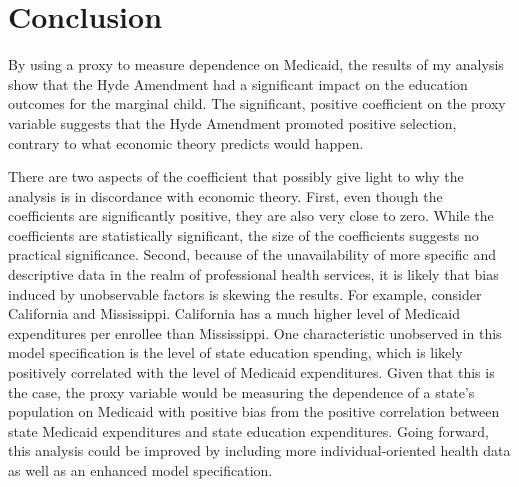 \section{Conclusion}
    By using a proxy to measure dependence on Medicaid, the results of my analysis show that the Hyde Amendment had a significant impact on the education outcomes for the marginal child. The significant, positive coefficient on the proxy variable suggests that the Hyde Amendment promoted positive selection, contrary to what economic theory predicts would happen. 

    There are two aspects of the coefficient that possibly give light to why the analysis is in discordance with economic theory. First, even though the coefficients are significantly positive, they are also very close to zero. While the coefficients are statistically significant, the size of the coefficients suggests no practical significance. Second, because of the unavailability of more specific and descriptive data in the realm of professional health services, it is likely that bias induced by unobservable factors is skewing the results. For example, consider California and Mississippi. California has a much higher level of Medicaid expenditures per enrollee than Mississippi. One characteristic unobserved in this model specification is the level of state education spending, which is likely positively correlated with the level of Medicaid expenditures. Given that this is the case, the proxy variable would be measuring the dependence of a state's population on Medicaid with positive bias from the positive correlation between state Medicaid expenditures and state education expenditures. Going forward, this analysis could be improved by including more individual-oriented health data as well as an enhanced model specification.

    \newpage
